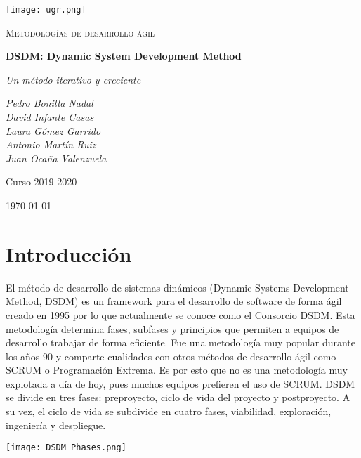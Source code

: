 \documentclass[12pt,a4paper]{article}
\begin{document}
\pgfplotsset{compat=1.15}
\begin{titlepage}
  \centering
  \texttt{[image: ugr.png]}\par\vspace{1cm}
  {\scshape\large Metodologías de desarrollo ágil \par} \vspace{1cm}
  {\huge\bfseries DSDM: Dynamic System Development Method \par}
  \vspace{0.4cm}
  {\large\itshape Un método iterativo y creciente\\}
  \vspace{0.6cm}
  {\large\itshape  Pedro Bonilla Nadal \\ David Infante Casas \\ Laura Gómez Garrido \\ Antonio Martín Ruiz \\ Juan Ocaña Valenzuela  \par} \vspace{1.00cm}
  Curso 2019-2020 \\
  \vfill

  {\large \today\par}
\end{titlepage}

\tableofcontents
\newpage

\setlength{\parskip}{10pt}

\section{Introducción}
El método de desarrollo de sistemas dinámicos (Dynamic Systems Development Method, DSDM) es un framework para el desarrollo de software de forma ágil creado en 1995 por lo que actualmente se conoce como el Consorcio DSDM. Esta metodología determina fases, subfases y principios que permiten a equipos de desarrollo trabajar de forma eficiente. Fue una metodología muy popular durante los años 90 y comparte cualidades con otros métodos de desarrollo ágil como SCRUM o Programación Extrema. Es por esto que no es una metodología muy explotada a día de hoy, pues muchos equipos prefieren el uso de SCRUM. DSDM se divide en tres fases: preproyecto, ciclo de vida del proyecto y postproyecto. A su vez, el ciclo de vida se subdivide en cuatro fases, viabilidad, exploración, ingeniería y despliegue.

\begin{center}
 \texttt{[image: DSDM\_Phases.png]}
\end{center}
\end{document}
